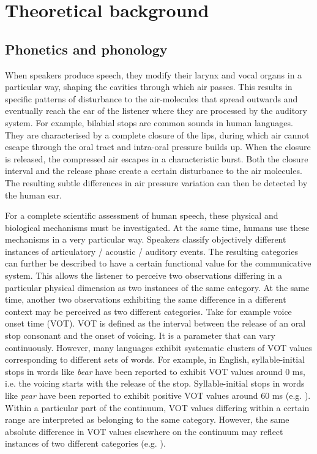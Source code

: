\chapter{Theoretical background}
\section{Phonetics and phonology}\label{sec:2.1}
When speakers produce speech, they modify their larynx and vocal organs in a particular way, shaping the cavities through which air passes. This results in specific patterns of disturbance to the air-molecules that spread outwards and eventually reach the ear of the listener where they are processed by the auditory system. For example, bilabial stops are common sounds in human languages. They are characterised by a complete closure of the lips, during which air cannot escape through the oral tract and intra-oral pressure builds up. When the closure is released, the compressed air escapes in a characteristic burst. Both the closure interval and the release phase create a certain disturbance to the air molecules. The resulting subtle differences in air pressure variation can then be detected by the human ear.

For a complete scientific assessment of human speech, these physical and biological mechanisms must be investigated. At the same time, humans use these mechanisms in a very particular way. Speakers classify objectively different instances of articulatory / acoustic / auditory events. The resulting categories can further be described to have a certain functional value for the communicative system. This allows the listener to perceive two observations differing in a particular physical dimension as two instances of the same category. At the same time, another two observations exhibiting the same difference in a different context may be perceived as two different categories. Take for example voice onset time (VOT). VOT is defined as the interval between the release of an oral stop consonant and the onset of voicing. It is a parameter that can vary continuously. However, many languages exhibit systematic clusters of VOT values corresponding to different sets of words. For example, in English, syllable-initial stops in words like \textit{bear} have been reported to exhibit VOT values around 0 ms, i.e. the voicing starts with the release of the stop. Syllable-initial stops in words like \textit{pear} have been reported to exhibit positive VOT values around 60 ms (e.g. \citealt{LiskerAbramson1964}). Within a particular part of the continuum, VOT values differing within a certain range are interpreted as belonging to the same category. However, the same absolute difference in VOT values elsewhere on the continuum may reflect instances of two different categories (e.g. \citealt{Liberman.etal1957}). 


